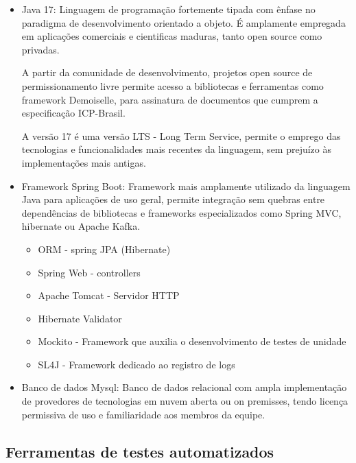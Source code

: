 \documentclass[
    12pt,               %
    openright,          %
    oneside,
    a4paper,            %
    BIBLATEX,           %
    TODO,               %
    english,            %
    brazil              %
    ]{ifsp-spo-inf-ctds}
\begin{document}
            \begin{itemize}
                \item Java 17: 
                    Linguagem de programação fortemente tipada com ênfase no paradigma de desenvolvimento orientado a objeto. É amplamente empregada em aplicações comerciais e cientificas maduras, tanto open source como privadas.
    
                    A partir da comunidade de desenvolvimento, projetos open source de permissionamento livre permite acesso a bibliotecas e ferramentas como framework Demoiselle, para assinatura de documentos que cumprem a especificação ICP-Brasil.
                    
                    A versão 17 é uma versão LTS - Long Term Service, permite o emprego das tecnologias e funcionalidades mais recentes da linguagem, sem prejuízo às implementações mais antigas.
        
                \item Framework Spring Boot: 
                    Framework mais amplamente utilizado da linguagem Java para aplicações de uso geral, permite integração sem quebras entre dependências de bibliotecas e frameworks especializados como Spring MVC, hibernate ou Apache Kafka.
                    \begin{itemize}
                        \item ORM - spring JPA (Hibernate)
                        \item Spring Web - controllers
                        \item Apache Tomcat - Servidor HTTP
                        \item Hibernate Validator
                        \item Mockito - Framework que auxilia o desenvolvimento de testes de unidade
                        \item SL4J - Framework dedicado ao registro de logs
                    \end{itemize}
                \item Banco de dados Mysql:
                    Banco de dados relacional com ampla implementação de provedores de tecnologias em nuvem aberta ou on premisses, tendo licença permissiva de uso e familiaridade aos membros da equipe.
            \end{itemize}
    
        \subsection{Ferramentas de testes automatizados}
        
\end{document}
